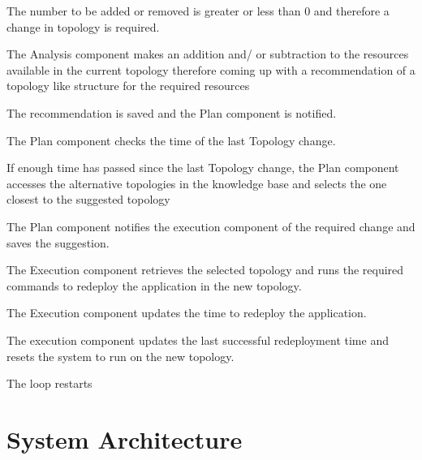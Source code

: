 \begin{usecase}
{	\item The number to be added or removed is greater or less than 0 and therefore a change in topology is required.
	\item The Analysis component makes an addition and/ or subtraction to the resources available in the current topology therefore coming up with a recommendation of a topology like structure for the required resources
	\item The recommendation is saved and the Plan component is notified.
	\item The Plan component checks the time of the last Topology change.
	\item If enough time has passed since the last Topology change, the Plan component accesses the alternative topologies in the knowledge base and selects the one closest to the suggested topology
	\item The Plan component notifies the execution component of the required change and saves the suggestion.
	\item The Execution component retrieves the selected topology and runs the required commands to redeploy the application in the new topology.
	\item The Execution component updates the time to redeploy the application.
	\item The execution component updates the last successful redeployment time and resets the system to run on the new topology.
	\item The loop restarts}
 \end{usecase}
 
\newpage
\section{System Architecture}
